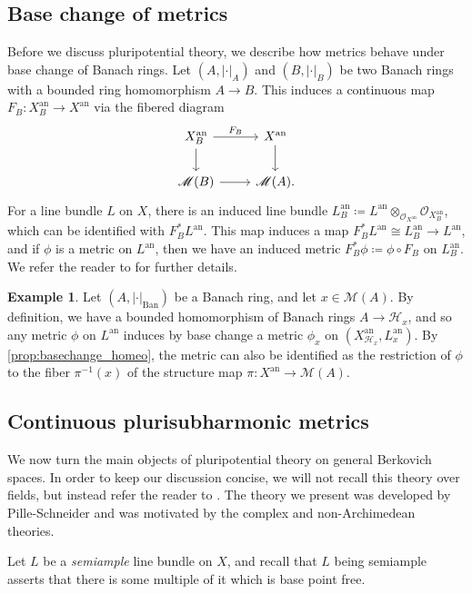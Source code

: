\documentclass[11pt,reqno]{amsart}
\newcommand{\cO}{\mathcal{O}}
\newcommand{\sH}{{\mathscr H}}
\newcommand{\sM}{{\mathscr M}}
\theoremstyle{theorem}
\numberwithin{equation}{subsection}
\numberwithin{equation}{subsection}
\theoremstyle{definition}
\newtheorem{example}[subsubsection]{Example}
\theoremstyle{remark}
\numberwithin{equation}{subsubsection} \numberwithin{figure}{section}
\DeclareMathOperator{\an}{an}
\newcommand{\cdef}[1]{\textsf{\textit{#1}}}
\DeclareMathOperator{\Ban}{Ban}
\begin{document}
\subsection{Base change of metrics}
\label{subsec:basechange}
Before we discuss pluripotential theory, we describe how metrics behave under base change of Banach rings. 
Let $(A,|\cdot|_A)$ and $(B,|\cdot|_B)$ be two Banach rings with a bounded ring homomorphism $A\to B$. This induces a continuous map $F_B\colon X_B^{\an} \to X^{\an}$ via the fibered diagram
\[
\begin{tikzcd}
X_B^{\an} \arrow{r}{F_B} \arrow{d} & X^{\an}\arrow{d} \\
\sM(B) \arrow{r} & \sM(A).
\end{tikzcd}
\]
For a line bundle $L$ on $X$, there is an induced line bundle $L_B^{\an} \coloneqq L^{\an} \otimes_{\cO_{X^{\an}}} \cO_{X_B^{\an}}$, which can be identified with $F_B^*L^{\an}$. This map induces a map $F_B^*L^{\an} \cong L_B^{\an} \to L^{\an}$, and if $\phi$ is a metric on $L^{\an}$, then we have an induced metric $F_B^*\phi \coloneqq \phi \circ F_B$ on $L_{B}^{\an}$. 
We refer the reader to \cite[Paragraph after Definition 2.7]{PilleSchneider:Global} for further details. 


\begin{example}\label{example:base_change_metrics}
Let $(A,|\cdot|_{\Ban})$ be a Banach ring, and let $x\in \sM(A)$. By definition, we have a bounded homomorphism of Banach rings $A \to \sH_x$, and so any metric $\phi$ on $L^{\an}$ induces by base change a metric $\phi_x$ on $(X_{\sH_x}^{\an},L_{x}^{\an})$. 
By \autoref{prop:basechange_homeo}, the metric can also be identified as the restriction of $\phi$ to the fiber $\pi^{-1}(x)$ of the structure map $\pi\colon X^{\an} \to \sM(A)$. 
\end{example}

\subsection{Continuous plurisubharmonic metrics}
We now turn the main objects of pluripotential theory on general Berkovich spaces. 
In order to keep our discussion concise, we will not recall this theory over fields, but instead refer the reader to \cite{BoucksomJonsson:SingularPSH, BoucksomEriksson:SpaceNorms}. 
The theory we present was developed by Pille-Schneider \cite{PilleSchneider:Global} and was motivated by the complex and non-Archimedean theories. 

Let $L$ be a \cdef{semiample} line bundle on $X$, and recall that $L$ being semiample asserts that there is some multiple of it which is base point free. 
\end{document}

